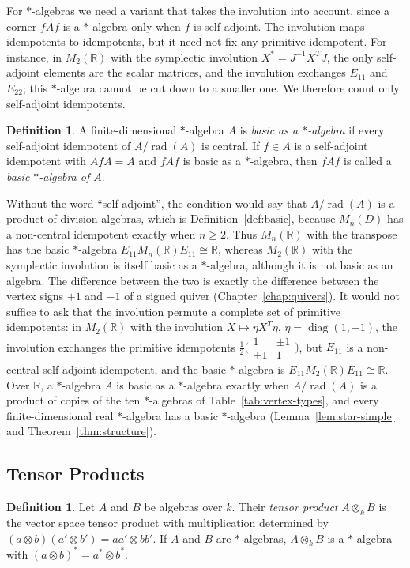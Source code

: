 \documentclass[12pt, a4paper]{report}
\theoremstyle{plain}
\theoremstyle{definition}
\newtheorem{definition}[theorem]{Definition}
\theoremstyle{remark}
\theoremstyle{plain}
\newcommand{\rad}[0]{\operatorname{rad}} %
\newcommand{\RR}{\mathbb{R}}
\DeclareMathOperator{\diag}{diag}
\begin{document}
For $*$-algebras we need a variant that takes the involution into account, since a corner $fAf$ is a $*$-algebra only when $f$ is self-adjoint. The involution maps idempotents to idempotents, but it need not fix any primitive idempotent. For instance, in $M_2(\RR)$ with the symplectic involution $X^*=J^{-1}X^TJ$, the only self-adjoint elements are the scalar matrices, and the involution exchanges $E_{11}$ and $E_{22}$; this $*$-algebra cannot be cut down to a smaller one. We therefore count only self-adjoint idempotents.

\begin{definition}\label{def:basic-star}
A finite-dimensional $*$-algebra $A$ is \emph{basic as a $*$-algebra} if every self-adjoint idempotent of $A/\rad(A)$ is central. If $f\in A$ is a self-adjoint idempotent with $AfA=A$ and $fAf$ is basic as a $*$-algebra, then $fAf$ is called a \emph{basic $*$-algebra of $A$}.
\end{definition}

Without the word ``self-adjoint'', the condition would say that $A/\rad(A)$ is a product of division algebras, which is Definition~\ref{def:basic}, because $M_n(D)$ has a non-central idempotent exactly when $n\geq2$. Thus $M_n(\RR)$ with the transpose has the basic $*$-algebra $E_{11}M_n(\RR)E_{11}\cong\RR$, whereas $M_2(\RR)$ with the symplectic involution is itself basic as a $*$-algebra, although it is not basic as an algebra. The difference between the two is exactly the difference between the vertex signs $+1$ and $-1$ of a signed quiver (Chapter~\ref{chap:quivers}). It would not suffice to ask that the involution permute a complete set of primitive idempotents: in $M_2(\RR)$ with the involution $X\mapsto\eta X^T\eta$, $\eta=\diag(1,-1)$, the involution exchanges the primitive idempotents $\frac12\bigl(\begin{smallmatrix}1&\pm1\\\pm1&1\end{smallmatrix}\bigr)$, but $E_{11}$ is a non-central self-adjoint idempotent, and the basic $*$-algebra is $E_{11}M_2(\RR)E_{11}\cong\RR$. Over $\RR$, a $*$-algebra $A$ is basic as a $*$-algebra exactly when $A/\rad(A)$ is a product of copies of the ten $*$-algebras of Table~\ref{tab:vertex-types}, and every finite-dimensional real $*$-algebra has a basic $*$-algebra (Lemma~\ref{lem:star-simple} and Theorem~\ref{thm:structure}).

\subsection{Tensor Products}
\label{subsec:tensor}
\begin{definition}\label{def:tensor}
Let $A$ and $B$ be algebras over $k$. Their \emph{tensor product} $A\otimes_kB$ is the vector space tensor product with multiplication determined by $(a\otimes b)(a'\otimes b')=aa'\otimes bb'$. If $A$ and $B$ are $*$-algebras, $A\otimes_kB$ is a $*$-algebra with $(a\otimes b)^*=a^*\otimes b^*$.
\end{definition}
\end{document}

